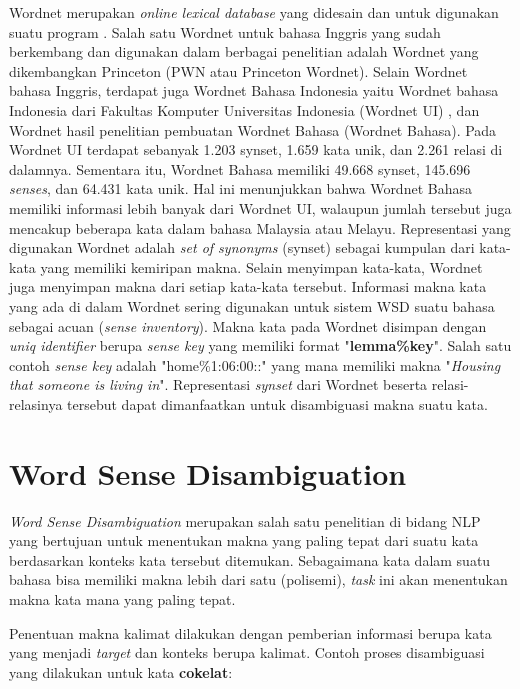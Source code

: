 Wordnet merupakan \textit{online lexical database} yang didesain dan untuk digunakan suatu program \citep{miller1995wordnet}. Salah satu Wordnet untuk bahasa Inggris yang sudah berkembang dan digunakan dalam berbagai penelitian adalah Wordnet yang dikembangkan Princeton (PWN atau Princeton Wordnet). Selain Wordnet bahasa Inggris, terdapat juga Wordnet Bahasa Indonesia yaitu Wordnet bahasa Indonesia dari Fakultas Komputer Universitas Indonesia (Wordnet UI) , dan Wordnet hasil penelitian pembuatan Wordnet Bahasa \citep{noor2011creating} (Wordnet Bahasa). Pada Wordnet UI terdapat sebanyak 1.203 synset, 1.659 kata unik, dan 2.261 relasi di dalamnya. Sementara itu, Wordnet Bahasa memiliki 49.668 synset, 145.696 \textit{senses}, dan 64.431 kata unik. Hal ini menunjukkan bahwa Wordnet Bahasa memiliki informasi lebih banyak dari Wordnet UI, walaupun jumlah tersebut juga mencakup beberapa kata dalam bahasa Malaysia atau Melayu. Representasi yang digunakan Wordnet adalah \textit{set of synonyms} (synset) sebagai kumpulan dari kata-kata yang memiliki kemiripan makna. Selain menyimpan kata-kata, Wordnet juga menyimpan makna dari setiap kata-kata tersebut. Informasi makna kata yang ada di dalam Wordnet sering digunakan untuk sistem WSD suatu bahasa sebagai acuan (\textit{sense inventory}). Makna kata pada Wordnet disimpan dengan \textit{uniq identifier} berupa \textit{sense key} yang memiliki format "\textbf{lemma\%key}". Salah satu contoh \textit{sense key} adalah "home\%1:06:00::" yang mana memiliki makna "\textit{Housing that someone is living in}". Representasi \textit{synset} dari Wordnet beserta relasi-relasinya tersebut dapat dimanfaatkan untuk disambiguasi makna suatu kata.

\section{Word Sense Disambiguation}
\textit{Word Sense Disambiguation} merupakan salah satu penelitian di bidang NLP yang bertujuan untuk menentukan makna yang paling tepat dari suatu kata berdasarkan konteks kata tersebut ditemukan. Sebagaimana kata dalam suatu bahasa bisa memiliki makna lebih dari satu (polisemi), \textit{task} ini akan menentukan makna kata mana yang paling tepat. 

Penentuan makna kalimat dilakukan dengan pemberian informasi berupa kata yang menjadi \textit{target} dan konteks berupa kalimat. Contoh proses disambiguasi yang dilakukan untuk kata \textbf{cokelat}:

